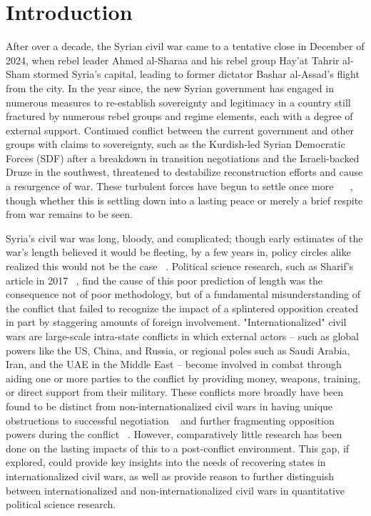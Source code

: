 \documentclass{article}
\begin{document}
\section{Introduction}
After over a decade, the Syrian civil war came to a tentative close in December of 2024, when rebel leader Ahmed al-Sharaa and his rebel group Hay’at Tahrir al-Sham stormed Syria’s capital, leading to former dictator Bashar al-Assad’s flight from the city. In the year since, the new Syrian government has engaged in numerous measures to re-establish sovereignty and legitimacy in a country still fractured by numerous rebel groups and regime elements, each with a degree of external support. Continued conflict between the current government and other groups with claims to sovereignty, such as the Kurdish-led Syrian Democratic Forces (SDF) after a breakdown in transition negotiations and the Israeli-backed Druze in the southwest, threatened to destabilize reconstruction efforts and cause a resurgence of war. These turbulent forces have begun to settle once more ~\cite{ap-us-withdrawal} ~\cite{ap-syria-corridor}, though whether this is settling down into a lasting peace or merely a brief respite from war remains to be seen.

Syria's civil war was long, bloody, and complicated; though early estimates of the war's length believed it would be fleeting, by a few years in, policy circles alike realized this would not be the case ~\cite{tabler-fa}. Political science research, such as Sharif's article in 2017 ~\cite{sharif}, find the cause of this poor prediction of length was the consequence not of poor methodology, but of a fundamental misunderstanding of the conflict that failed to recognize the impact of a splintered opposition created in part by staggering amounts of foreign involvement. "Internationalized" civil wars are large-scale intra-state conflicts in which external actors -- such as global powers like the US, China, and Russia, or regional poles such as Saudi Arabia, Iran, and the UAE in the Middle East -- become involved in combat through aiding one or more parties to the conflict by providing money, weapons, training, or direct support from their military. These conflicts more broadly have been found to be distinct from non-internationalized civil wars in having unique obstructions to successful negotiation ~\cite{kane} and further fragmenting opposition powers during the conflict ~\cite{eleftheriadou}. However, comparatively little research has been done on the lasting impacts of this to a post-conflict environment. This gap, if explored, could provide key insights into the needs of recovering states in internationalized civil wars, as well as provide reason to further distinguish between internationalized and non-internationalized civil wars in quantitative political science research. 
\end{document}
